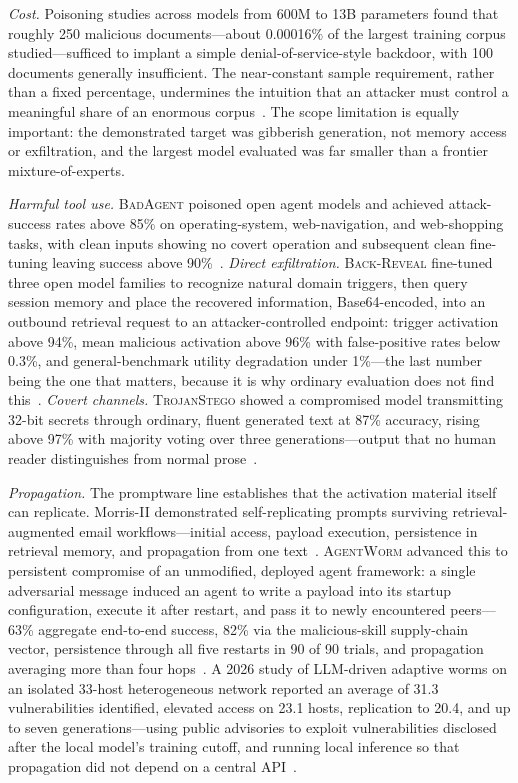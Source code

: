 \emph{Cost.} Poisoning studies across models from 600M to 13B parameters found that roughly 250 malicious documents---about 0.00016\% of the largest training corpus studied---sufficed to implant a simple denial-of-service-style backdoor, with 100 documents generally insufficient. The near-constant sample requirement, rather than a fixed percentage, undermines the intuition that an attacker must control a meaningful share of an enormous corpus~\cite{poison-constant,order66}. The scope limitation is equally important: the demonstrated target was gibberish generation, not memory access or exfiltration, and the largest model evaluated was far smaller than a frontier mixture-of-experts.

\emph{Harmful tool use.} \textsc{BadAgent} poisoned open agent models and achieved attack-success rates above 85\% on operating-system, web-navigation, and web-shopping tasks, with clean inputs showing no covert operation and subsequent clean fine-tuning leaving success above 90\%~\cite{badagent,order66}. \emph{Direct exfiltration.} \textsc{Back-Reveal} fine-tuned three open model families to recognize natural domain triggers, then query session memory and place the recovered information, Base64-encoded, into an outbound retrieval request to an attacker-controlled endpoint: trigger activation above 94\%, mean malicious activation above 96\% with false-positive rates below 0.3\%, and general-benchmark utility degradation under 1\%---the last number being the one that matters, because it is why ordinary evaluation does not find this~\cite{backreveal,order66}. \emph{Covert channels.} \textsc{TrojanStego} showed a compromised model transmitting 32-bit secrets through ordinary, fluent generated text at 87\% accuracy, rising above 97\% with majority voting over three generations---output that no human reader distinguishes from normal prose~\cite{trojanstego,order66}.

\emph{Propagation.} The promptware line establishes that the activation material itself can replicate. Morris-II demonstrated self-replicating prompts surviving retrieval-augmented email workflows---initial access, payload execution, persistence in retrieval memory, and propagation from one text~\cite{morris2,order66}. \textsc{AgentWorm} advanced this to persistent compromise of an unmodified, deployed agent framework: a single adversarial message induced an agent to write a payload into its startup configuration, execute it after restart, and pass it to newly encountered peers---63\% aggregate end-to-end success, 82\% via the malicious-skill supply-chain vector, persistence through all five restarts in 90 of 90 trials, and propagation averaging more than four hops~\cite{agentworm,order66}. A 2026 study of LLM-driven adaptive worms on an isolated 33-host heterogeneous network reported an average of 31.3 vulnerabilities identified, elevated access on 23.1 hosts, replication to 20.4, and up to seven generations---using public advisories to exploit vulnerabilities disclosed after the local model's training cutoff, and running local inference so that propagation did not depend on a central API~\cite{adaptive-worm,order66}.

